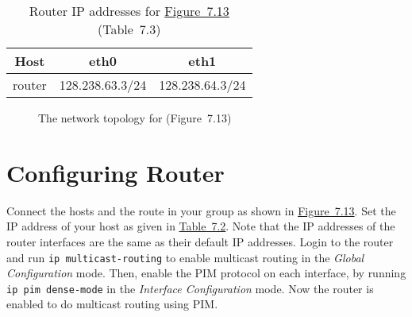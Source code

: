 \documentclass{../UTNetLab}
\begin{document}
    \begin{table}[H]
        \caption{Router IP addresses for \hyperref[fig:7.13]{Figure~7.13} (Table~7.3)}
        \label{tab:7.3}
        \centering
        \begin{tabular}{ *3c }
            \hline \hline
            Host & eth0 & eth1 \\
            \hline
            router & 128.238.63.3/24 & 128.238.64.3/24 \\
            \hline \hline
            \end{tabular}
    \end{table}

    \begin{figure}[H]
        \centering
        \caption{The network topology for  (Figure~7.13)}
        \label{fig:7.13}
    \end{figure}

\section{Configuring Router}
\label{sec:config-router}
    Connect the hosts and the route in your group as shown in \hyperref[fig:7.13]{Figure~7.13}.
    Set the IP address of your host as given in \hyperref[tab:7.2]{Table~7.2}.
    Note that the IP addresses of the router interfaces are the same as their default IP addresses.
    Login to the router and run \lstinline{ip multicast-routing} to enable multicast routing in the \textit{Global Configuration} mode.
    Then, enable the PIM protocol on each interface, by running \lstinline{ip pim dense-mode} in the \textit{Interface Configuration} mode.
    Now the router is enabled to do multicast routing using PIM.
\end{document}
